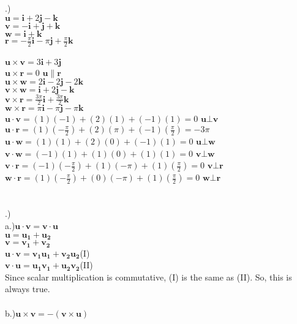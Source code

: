 \documentclass[12pt]{article}
\begin{document}
.)\\
\noindent$\mathbf{u} = \mathbf{i} + 2\mathbf{j} - \mathbf{k}$\\
\noindent$\mathbf{v} = -\mathbf{i} +\mathbf{j} + \mathbf{k}$\\
\noindent$\mathbf{w} = \mathbf{i} + \mathbf{k}$\\
\noindent$\mathbf{r} = -\frac{\pi}{2}\mathbf{i}-\pi\mathbf{j} + \frac{\pi}{2}\mathbf{k}$\\\\


\noindent $\mathbf{u \times v} = 3\mathbf{i} + 3\mathbf{j}$\\
\noindent $\mathbf{u \times r} = 0$ \hspace{10pt} $\mathbf{u} \parallel \mathbf{r}$\\
\noindent $\mathbf{u \times w} = 2\mathbf{i} - 2\mathbf{j} - 2\mathbf{k}$\\
\noindent $\mathbf{v \times w} = \mathbf{i} + 2\mathbf{j} - \mathbf{k}$\\
\noindent $\mathbf{v \times r} = \frac{3\pi}{2}\mathbf{i} + \frac{3\pi}{2}\mathbf{k}$\\
\noindent $\mathbf{w \times r} =\pi\mathbf{i} - \pi\mathbf{j} -\pi\mathbf{k} $\\
\noindent $\mathbf{u \cdot v} = (1)(-1)+(2)(1)+(-1)(1)=0$ \hspace{10pt} $\mathbf{u} \bot \mathbf{v}$\\
\noindent $\mathbf{u \cdot r} = (1)(-\frac{\pi}{2})+(2)(\pi)+(-1)(\frac{\pi}{2})=-3\pi$\\
\noindent $\mathbf{u \cdot w} = (1)(1)+(2)(0)+(-1)(1)=0$ \hspace{10pt} $\mathbf{u \bot w}$\\
\noindent $\mathbf{v \cdot w} = (-1)(1)+(1)(0)+(1)(1) = 0$ \hspace{10pt} $\mathbf{v \bot w}$\\
\noindent $\mathbf{v \cdot r} = (-1)(-\frac{\pi}{2})+(1)(-\pi)+(1)(\frac{\pi}{2})=0$ \hspace{10pt} $\mathbf{v \bot r}$\\
\noindent $\mathbf{w \cdot r} = (1)(-\frac{\pi}{2})+(0)(-\pi)+(1)(\frac{\pi}{2})= 0 $ \hspace{10pt} $\mathbf{w \bot r}$\\\\\\


.)\\
a.)$\mathbf{u \cdot v} = \mathbf{v \cdot u}$\\
$\mathbf{u} = \mathbf{u_{1}} + \mathbf{u_{2}}$\\
$\mathbf{v} = \mathbf{v_{1}} + \mathbf{v_{2}}$\\
$\mathbf{u \cdot v} = \mathbf{v_{1}u_{1}} + \mathbf{v_{2}u_{2}}$(I)\\
$\mathbf{v \cdot u} = \mathbf{u_{1}v_{1}} + \mathbf{u_{2}v_{2}}$(II)\\
Since scalar multiplication is commutative, (I) is the same as (II). So, this is always true.\\\\
b.)$\mathbf{u \times v} = -(\mathbf{v \times u})$\\
\end{document}
